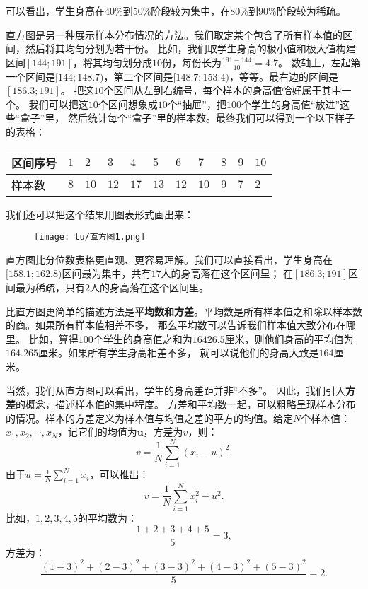 \documentclass[12pt,UTF8]{ctexbook}
\theoremstyle{definition}
\theoremstyle{plain}
\begin{document}
可以看出，学生身高在$40\%$到$50\%$阶段较为集中，在$80\%$到$90\%$阶段较为稀疏。


直方图是另一种展示样本分布情况的方法。我们取定某个包含了所有样本值的区间，然后将其均匀分划为若干份。
比如，我们取学生身高的极小值和极大值构建区间$[144;191]$，将其均匀划分成$10$份，每份长为$\frac{191-144}{10}=4.7$。
数轴上，左起第一个区间是$[144;148.7)$，第二个区间是$[148.7;153.4)$，等等。最右边的区间是$[186.3;191]$。
把这$10$个区间从左到右编号，每个样本的身高值恰好属于其中一个。
我们可以把这$10$个区间想象成$10$个“抽屉”，把$100$个学生的身高值“放进”这些“盒子”里，
然后统计每个“盒子”里的样本数。最终我们可以得到一个以下样子的表格：
\begin{center}
    \begin{tabular}{ | p{4em}<{\centering} | p{1.7em}<{\centering} | p{1.7em}<{\centering} | p{1.7em}<{\centering} | p{1.7em}<{\centering} | p{1.7em}<{\centering} | p{1.7em}<{\centering} | p{1.7em}<{\centering} | p{1.7em}<{\centering} | p{1.7em}<{\centering} | p{1.7em}<{\centering} | }
        \hline
        区间序号 & $1$ & $2$  & $3$  & $4$  & $5$  & $6$  & $7$  & $8$ & $9$ & $10$ \\ [0.5ex] 
        \hline
        样本数   & $8$ & $10$ & $12$ & $17$ & $13$ & $12$ & $10$ & $9$ & $7$ & $2$  \\  
        \hline
    \end{tabular}
\end{center}
我们还可以把这个结果用图表形式画出来：

\begin{figure}[h] %
    \vspace{8pt}
    \centering
    \texttt{[image: tu/直方图1.png]}
\end{figure}

直方图比分位数表格更直观、更容易理解。我们可以直接看出，学生身高在$[158.1;162.8)$区间最为集中，共有$17$人的身高落在这个区间里；
在$[186.3;191]$区间最为稀疏，只有$2$人的身高落在这个区间里。

比直方图更简单的描述方法是\textbf{平均数和方差}。平均数是所有样本值之和除以样本数的商。如果所有样本值相差不多，
那么平均数可以告诉我们样本值大致分布在哪里。
比如，算得$100$个学生的身高值之和为$16426.5$厘米，则他们身高的平均值为$164.265$厘米。如果所有学生身高相差不多，
就可以说他们的身高大致是$164$厘米。

当然，我们从直方图可以看出，学生的身高差距并非“不多”。
因此，我们引入\textbf{方差}的概念，描述样本值的集中程度。
方差和平均数一起，可以粗略呈现样本分布的情况。样本的方差定义为样本值与均值之差的平方的均值。给定$N$个样本值：
$x_1, x_2, \cdots, x_N$，记它们的均值为$\mathbf{u}$，方差为$v$，则：
$$ v = \frac{1}{N}\sum_{i=1}^N \left(x_i - u\right)^2.$$
由于$u = \frac{1}{N}\sum_{i=1}^N x_i$，可以推出：
$$v = \frac{1}{N}\sum_{i=1}^N x_i^2 - u^2.$$
比如，$1,2,3,4,5$的平均数为：
$$ \frac{1+2+3+4+5}{5} = 3,$$
方差为：
$$ \frac{(1 - 3)^2 + (2 - 3)^2 + (3 - 3)^2 + (4 - 3)^2 + (5 - 3)^2}{5} = 2.$$
\end{document}
